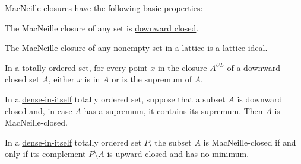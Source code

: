 \begin{proposition}\label{thm:def:macnielle_closure}
  \hyperref[def:dedekind_macnielle_completion]{MacNeille closures} have the following basic properties:
  \begin{thmenum}
     The MacNeille closure of any set is \hyperref[def:closed_ordered_subset]{downward closed}.

     The MacNeille closure of any nonempty set in a lattice is a \hyperref[def:lattice_ideal]{lattice ideal}.

     In a \hyperref[def:totally_ordered_set]{totally ordered set}, for every point \( x \) in the closure \( A^{UL} \) of a \hyperref[def:closed_ordered_subset]{downward closed} set \( A \), either \( x \) is in \( A \) or is the supremum of \( A \).

     In a \hyperref[def:dense_total_order]{dense-in-itself} totally ordered set, suppose that a subset \( A \) is downward closed and, in case \( A \) has a supremum, it contains its supremum. Then \( A \) is MacNeille-closed.

     In a \hyperref[def:dense_total_order]{dense-in-itself} totally ordered set \( P \), the subset \( A \) is MacNeille-closed if and only if its complement \( P \setminus A \) is upward closed and has no minimum.
  \end{thmenum}
\end{proposition}
